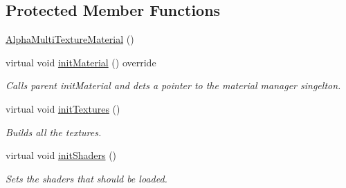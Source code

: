 \subsection*{Protected Member Functions}
\begin{DoxyCompactItemize}
\item 
\mbox{\hyperlink{class_geometry_engine_1_1_geometry_material_1_1_alpha_multi_texture_material_af883af0dec0ed3cb9914b465f1529766}{Alpha\+Multi\+Texture\+Material}} ()
\item 
\mbox{\label{class_geometry_engine_1_1_geometry_material_1_1_alpha_multi_texture_material_a8e4b2cf4bdeb875a43761b4d0c8ee692}} 
virtual void \mbox{\hyperlink{class_geometry_engine_1_1_geometry_material_1_1_alpha_multi_texture_material_a8e4b2cf4bdeb875a43761b4d0c8ee692}{init\+Material}} () override
\begin{DoxyCompactList}\small\item\em Calls parent init\+Material and dets a pointer to the material manager singelton. \end{DoxyCompactList}\item 
\mbox{\label{class_geometry_engine_1_1_geometry_material_1_1_alpha_multi_texture_material_a4f3d0fc7bb0420b37b30530ed856209c}} 
virtual void \mbox{\hyperlink{class_geometry_engine_1_1_geometry_material_1_1_alpha_multi_texture_material_a4f3d0fc7bb0420b37b30530ed856209c}{init\+Textures}} ()
\begin{DoxyCompactList}\small\item\em Builds all the textures. \end{DoxyCompactList}\item 
\mbox{\label{class_geometry_engine_1_1_geometry_material_1_1_alpha_multi_texture_material_aa4f70a5366fb2bd1a5185406d580819b}} 
virtual void \mbox{\hyperlink{class_geometry_engine_1_1_geometry_material_1_1_alpha_multi_texture_material_aa4f70a5366fb2bd1a5185406d580819b}{init\+Shaders}} ()
\begin{DoxyCompactList}\small\item\em Sets the shaders that should be loaded. \end{DoxyCompactList}\item 

\end{DoxyCompactItemize}
